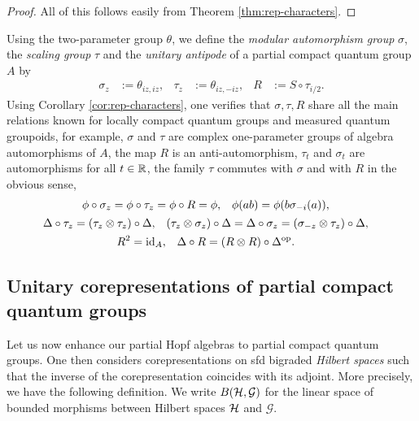 \begin{proof}
  All of this follows easily from Theorem \ref{thm:rep-characters}.
\end{proof}
Using the two-parameter group $\theta$, we define the \emph{modular
  automorphism group} $\sigma$, the \emph{scaling group} $\tau$   and
the \emph{unitary antipode} of a partial compact quantum group $A$ by
\begin{align} \label{eq:rep-groups}
  \sigma_{z} &:=\theta_{iz,iz}, & \tau_{z} &:=\theta_{iz,-iz}, & R&:=S
  \circ \tau_{i/2}.
\end{align}
Using Corollary \ref{cor:rep-characters}, one verifies that
$\sigma,\tau,R$ share all the main relations known for locally compact
quantum groups and measured quantum groupoids, for example, $\sigma$
and $\tau$ are complex one-parameter groups of algebra automorphisms
of $A$, the map $R$ is an anti-automorphism,  $\tau_{t}$ and
$\sigma_{t}$ are automorphisms for all $t\in \mathbb{R}$, the family  $\tau$ commutes with
$\sigma$ and with $R$ in the obvious sense, 
  \begin{gather}
    \begin{aligned} \label{eq:modular}
      \phi\circ \sigma_{z} &= \phi \circ \tau_{z} = \phi \circ R =
      \phi, & \phi(ab) &= \phi(b\sigma_{-i}(a)),
    \end{aligned}
\\ \label{eq:scaling-modular-delta}
    \begin{aligned} 
    \Delta \circ \tau_{z} &= (\tau_{z} \otimes \tau_{z}) \circ \Delta,
    & (\tau_{z} \otimes \sigma_{z}) \circ \Delta &= \Delta \circ
    \sigma_{z} = (\sigma_{-z} \otimes \tau_{z}) \circ \Delta,      
  \end{aligned} \\
  \begin{aligned} \label{eq:unitary-antipode}
    R^{2} &= \operatorname{id}_{A}, & \Delta \circ R &= (R \otimes R) \circ
    \Delta^{\operatorname{\mathrm{op}}}.
  \end{aligned}
  \end{gather}



\subsection{Unitary corepresentations of partial compact quantum groups}


Let us now enhance our partial Hopf algebras to partial compact
quantum groups. One then considers corepresentations on sfd bigraded
\emph{Hilbert spaces} such that the inverse of the corepresentation
coincides with its adjoint. More precisely, we have the following
definition. We write $B(\mathcal{H},\mathcal{G})$ for the linear space of
bounded morphisms between Hilbert spaces $\mathcal{H}$ and $\mathcal{G}$.

